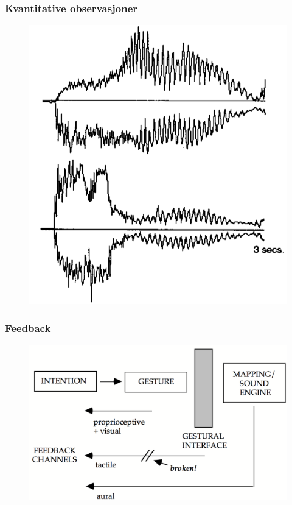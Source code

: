 \documentclass{beamer}
\begin{document}
\begin{frame}
	\frametitle{Kvantitative observasjoner}
	\begin{figure}
		\includegraphics[scale=.25]{figs/chafe.png}
		\vspace{-15pt}
		\caption{\citep[p.\ 76]{chafe_tactile_1993}}
	\end{figure}
\end{frame}

\begin{frame}
	\frametitle{Feedback}
	\begin{figure}
		\includegraphics[scale=.23]{figs/broken.png}
		\caption{\citep[p.\ 356]{rovan_typology_2000}}
	\end{figure}
\end{frame}
\end{document}
